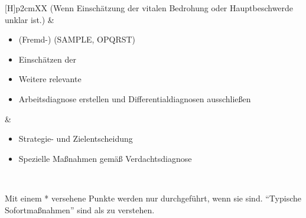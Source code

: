 {\begin{minipage}[t]{\linewidth -
{2\fboxrule} - {2\fboxsep}}
\begin{minipage}[t]{\linewidth}
{\begin{tabularx}{\linewidth}[H]{p{2cm}XX}
{\tiny (Wenn Einschätzung der vitalen
Bedrohung oder Hauptbeschwerde unklar ist.)}
&
\begin{minipage}[t]{\linewidth}
\begin{itemize}
  \item (Fremd-)  (SAMPLE, OPQRST)
  \item Einschätzen der 
  \item Weitere relevante 
  \item Arbeitsdiagnose erstellen und Differentialdiagnosen
  ausschließen
\end{itemize}
\end{minipage}
&
\noindent\color{DefaultA}\begin{minipage}[t]{\linewidth}
\begin{itemize}
  \item Strategie- und Zielentscheidung 
  \item Spezielle Maßnahmen gemäß Verdachtsdiagnose
\end{itemize}
\end{minipage}
\\\addlinespace\bottomrule
\end{tabularx}

\begin{center}
   \tiny

{ Mit einem * versehene Punkte werden nur durchgeführt,
wenn sie  sind. \enquote{Typische
Sofortmaßnahmen} sind als  zu verstehen. 

}
\end{center}}
\end{minipage}
\end{minipage}}
